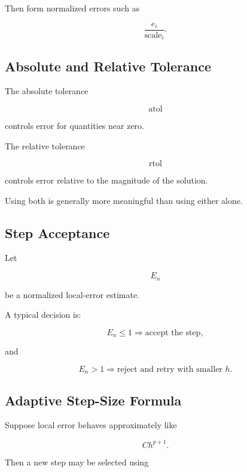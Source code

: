 Then form normalized errors such as

\[
\boxed{
\frac{
e_i
}{
\mathrm{scale}_i
}.
}
\]

\subsection{Absolute and Relative Tolerance}
\label{subsec:ode-atol-rtol}

The absolute tolerance

\[
\boxed{
\mathrm{atol}
}
\]

controls error for quantities near zero.

The relative tolerance

\[
\boxed{
\mathrm{rtol}
}
\]

controls error relative to the magnitude of the solution.

Using both is generally more meaningful than using either alone.

\subsection{Step Acceptance}
\label{subsec:ode-step-acceptance}

Let

\[
E_n
\]

be a normalized local-error estimate.

A typical decision is:

\[
\boxed{
E_n\leq1
\Rightarrow
\text{accept the step},
}
\]

and

\[
\boxed{
E_n>1
\Rightarrow
\text{reject and retry with smaller }h.
}
\]

\subsection{Adaptive Step-Size Formula}
\label{subsec:adaptive-step-formula}

Suppose local error behaves approximately like

\[
C h^{p+1}.
\]

Then a new step may be selected using

